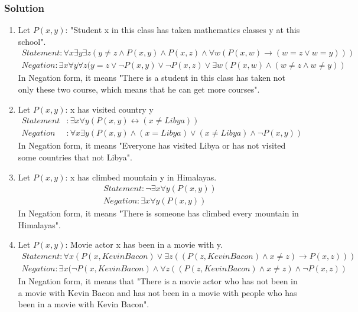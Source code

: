 \documentclass{article}
\begin{document}
\subsubsection*{Solution}
\begin{enumerate} [label = (\alph*)]
    \item Let $P(x, y)$: "Student x in this class has taken mathematics classes y at this school".
          \begin{align}
              Statement: \forall x\exists y \exists z(y \ne z \land P(x, y) \land P(x, z) \land \forall w(P(x, w) \rightarrow (w = z \lor w = y))) \nonumber \\
              Negation: \exists x \forall y \forall z(y = z \lor \lnot P(x, y) \lor \lnot P(x, z) \lor \exists w (P(x, w) \land (w \ne z \land w \ne y))\nonumber
          \end{align}
          In Negation form, it means "There is a student in this class has taken not only these two course, which means that he can get more courses".
    \item Let $P(x, y)$: x has visited country y
          \begin{align}
              Statement & : \exists x \forall y(P(x, y) \leftrightarrow (x \ne Libya)) \nonumber                           \\
              Negation  & : \forall x \exists y(P(x,y) \land (x = Libya) \lor (x \ne Libya) \land \lnot P(x, y)) \nonumber
          \end{align}
          In Negation form, it means "Everyone has visited Libya or has not visited some countries that not Libya".
    \item Let $P(x, y)$: x has climbed mountain y in Himalayas.
          \begin{align}
              Statement: \lnot \exists x\forall y(P(x, y)) \nonumber \\
              Negation: \exists x \forall y(P(x, y)) \nonumber
          \end{align}
          In Negation form, it means "There is someone has climbed every mountain in Himalayas".
    \item Let $P(x, y)$: Movie actor x has been in a movie with y.
          \begin{align}
              Statement: \forall x(P(x, Kevin Bacon) \lor \exists z((P(z, Kevin Bacon) \land x \ne z) \rightarrow P(x, z))) \nonumber \\
              Negation: \exists x(\lnot P(x, Kevin Bacon) \land \forall z((P(z, Kevin Bacon) \land x \ne z) \land \lnot P(x, z)) \nonumber
          \end{align}
          In Negation form, it means that "There is a movie actor who has not been in a movie with Kevin Bacon and has not been in a movie with people who has been in a movie with Kevin Bacon".
\end{enumerate}
\end{document}
